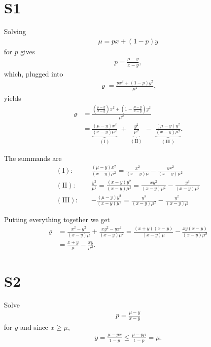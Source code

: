 \documentclass[11pt, paper=a4]{article}
\begin{document}
\section*{S1}

Solving
\begin{align}
\mu = px + (1-p)y
\end{align}
for $p$ gives
\begin{align}
  p = \frac{\mu-y}{x-y},
\end{align}
%
which, plugged into
\begin{align}
  \varrho = \frac{p x^2 + (1-p) y^2}{\mu^2},
\end{align}
yields
\begin{align}
  \varrho & = \frac{\left(\frac{\mu-y}{x-y}\right)x^2  + \left(1-\frac{\mu-y}{x-y}\right) y^2}{\mu^2} \\ & = \underbrace{\frac{(\mu - y)x^2}{(x-y)\mu^2}}_{\mathrm{(I)}}\,\, + \,\, \underbrace{\frac{y^2}{\mu^2}}_{\mathrm{(II)}}\,\, - \,\, \underbrace{\frac{(\mu - y)y^2}{(x-y) \mu^2}}_{\mathrm{(III)}}.
\end{align}

The summands are
\begin{align}
  \mathrm{(I):} \quad & \frac{(\mu - y)x^2}{(x-y)\mu^2} = \frac{x^2}{(x-y)\mu} - \frac{yx^2}{(x-y)\mu^2} \\
  \mathrm{(II):} \quad &  \frac{y^2}{\mu^2} = \frac{(x-y)y^2}{(x-y)\mu^2} = \frac{xy^2}{(x-y)\mu^2} - \frac{y^3}{(x-y)\mu^2} \\
  \mathrm{(III):} \quad & - \frac{(\mu - y)y^2}{(x-y) \mu^2} = \frac{y^3}{(x-y)\mu^2} - \frac{y^2}{(x-y)\mu}
\end{align}

Putting everything together we get
\begin{align}
  \varrho & =  \frac{x^2 - y^2}{(x-y)\mu} + \frac{xy^2 -yx^2}{(x-y)\mu^2}  = \frac{(x + y) (x-y)}{(x-y)\mu} - \frac{xy (x-y)}{(x-y)\mu^2} \\
  & = \frac{x+y}{\mu} - \frac{xy}{\mu^2}.
\end{align}

\section*{S2}
Solve
\begin{align}
  p = \frac{\mu-y}{x-y}
\end{align}
for $y$ and since $x \geq \mu$,
\begin{align}
y = \frac{\mu - px}{1-p} \leq \frac{\mu - p\mu}{1-p} = \mu.
\end{align}
\end{document}
